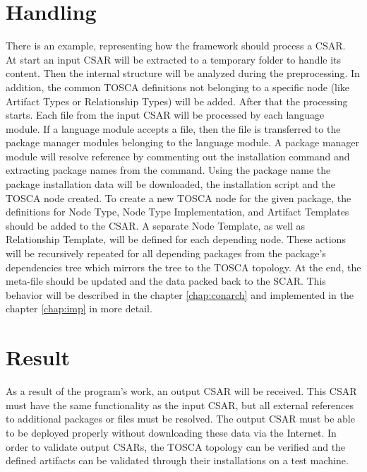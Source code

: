 \section*{Handling}
There is an example, representing how the framework should process a CSAR.\\
At start an input CSAR will be extracted to a temporary folder to handle its content.
Then the internal structure will be analyzed during the preprocessing. 
In addition, the common TOSCA definitions not belonging to a specific node (like Artifact Types or Relationship Types) will be added. 
After that the processing starts. 
Each file from the input CSAR will be processed by each language module.
If a language module accepts a file, then the file is transferred to the package manager modules belonging to the language module.
A package manager module will resolve reference by commenting out the installation command and extracting package names from the command.
Using the package name the package installation data will be downloaded, the installation script and the TOSCA node created. 
To create a new TOSCA node for the given package, the definitions for Node Type, Node Type Implementation, and Artifact Templates should be added to the CSAR. 
A separate Node Template, as well as Relationship Template, will be defined for each depending node.
These actions will be recursively repeated for all depending packages from the package's dependencies tree which mirrors the tree to the TOSCA topology.
At the end, the meta-file should be updated and the data packed back to the SCAR. %
This behavior will be described in the chapter \ref{chap:conarch} and implemented in the chapter \ref{chap:imp} in more detail.
\fi
\section*{Result}
As a result of the program's work, an output CSAR will be received.      
This CSAR must have the same functionality as the input CSAR, but all external references to additional packages or files must be resolved.
The output CSAR must be able to be deployed properly without downloading these data via the Internet. 
In order to validate output CSARs, the TOSCA topology can be verified and the defined artifacts can be validated through their installations on a test machine. 
